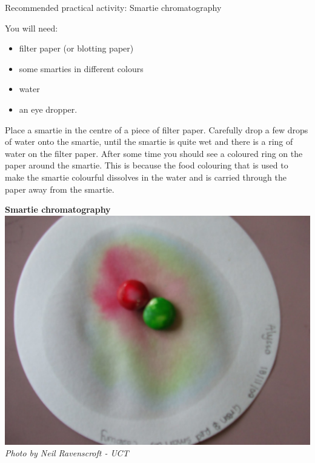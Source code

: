 \begin{activity}{Recommended practical activity: Smartie chromatography}{
You will need:
\begin{itemize}[noitemsep]
\item filter paper (or blotting paper)
\item some smarties in different colours
\item water
\item an eye dropper.
\end{itemize}
\begin{minipage}{.5\textwidth}
Place a smartie in the centre of a piece of filter paper. Carefully drop a few drops of water onto the smartie, until the smartie is quite wet and there is a ring of water on the filter paper. After some time you should see a coloured ring on the paper around the smartie. This is because the food colouring that is used to make the smartie colourful dissolves in the water and is carried through the paper away from the smartie. 
\end{minipage}
\begin{minipage}{.5\textwidth}
\begin{center}
\textbf{Smartie chromatography}\\
 \includegraphics[width=.8\textwidth]{photos/smartie2.jpg}\\
\textit{Photo by Neil Ravenscroft - UCT}
\end{center}
\end{minipage}
}
\end{activity}
      \label{m38708*uid25}
